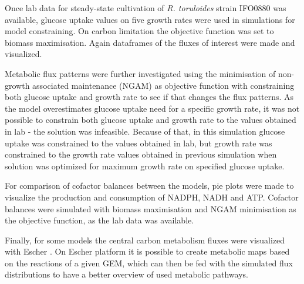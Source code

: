 Once lab data for steady-state cultivation of \textit{R. toruloides} strain IFO0880 was available, glucose uptake values 
on five growth rates were used in simulations for model constraining. On carbon limitation the objective
function was set to biomass maximisation. Again dataframes of the fluxes of interest were made and visualized.

Metabolic flux patterns were further investigated using the minimisation of non-growth associated maintenance (NGAM) as objective 
function with constraining both glucose uptake and growth rate to see if that changes the flux patterns. 
As the model overestimates glucose uptake need for a specific growth rate, 
it was not possible to constrain both glucose uptake and growth rate to the values obtained in lab - the solution was infeasible.
Because of that, in this simulation glucose uptake was constrained to the values obtained in lab, but growth rate was constrained to 
the growth rate values obtained in previous simulation when solution was optimized for maximum growth rate on specified glucose uptake. 

For comparison of cofactor balances between the models, pie plots were made to visualize the production and consumption of NADPH, NADH and ATP. %
Cofactor balances were simulated with biomass maximisation and NGAM minimisation 
as the objective function, as the lab data was available.

Finally, for some models the central carbon metabolism fluxes were visualized with Escher \cite{King2015}. On Escher platform it is possible
to create metabolic maps based on the reactions of a given GEM, which can then be fed with the simulated
flux distributions to have a better overview of used metabolic pathways.
